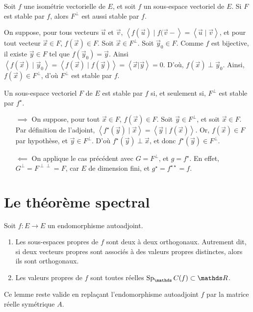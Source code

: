 \begin{prop}
	Soit $f$\/ une isométrie vectorielle de $E$, et soit $f$\/ un sous-espace vectoriel de $E$. Si $F$\/ est stable par $f$, alors $F^\perp$\/ est aussi stable par $f$.
\end{prop}

\begin{prv}
	On suppose, pour tous vecteurs $\vec{u}$\/ et $\vec{v}$, $\left<f(\vec{u}) \mid f(\vec{v}- \right> = \left<\vec{u}  \mid \vec{v} \right>$, et pour tout vecteur $\vec{x} \in F$, $f(\vec{x}) \in F$.
	Soit $\vec{x} \in F^\perp$.
	Soit $\vec{y}_0 \in F$.
	Comme $f$\/ est bijective, il existe $\vec{y} \in F$\/ tel que $f(\vec{y}_0) = \vec{y}$.
	Ainsi $\left<f(\vec{x})  \mid \vec{y}_0 \right> = \left<f(\vec{x})  \mid f(\vec{y}) \right> = \left<\vec{x} | \vec{y}\right> = 0$.
	D'où, $f(\vec{x}) \perp \vec{y}_0$.
	Ainsi, $f(\vec{x}) \in F^\perp$, d'où $F^\perp$\/ est stable par $f$.
\end{prv}

\begin{prop}
	 Un sous-espace vectoriel $F$\/ de $E$\/ est stable par $f$\/ si, et seulement si, $F^\perp$\/ est stable par $f^\star$.
\end{prop}

\begin{prv}
	\begin{itemize}
		\item[$\implies$] On suppose, pour tout $\vec{x} \in F$, $f(\vec{x}) \in F$. Soit $\vec{y} \in F^\perp$, et soit $\vec{x} \in F$.
			Par définition de l'adjoint, $\left<f^\star (\vec{y})  \mid \vec{x} \right> = \left<\vec{y}  \mid f(\vec{x}) \right>$.
			Or, $f(\vec{x}) \in F$\/ par hypothèse, et $\vec{y} \in F^\perp$.
			D'où $f^\star (\vec{y}) \perp \vec{x}$, et donc $f^\star (\vec{y}) \in F^\perp$.
		\item[$\impliedby$] On applique le cas précédent avec $G = F^\perp$, et $g = f^\star$. En effet, $G^\perp = F^{\perp\perp} = F$, car $E$\/ de dimension fini, et $g^\star = f^{\star\star} = f$.
	\end{itemize}
\end{prv}

\section{Le théorème spectral}

\begin{lem}
	Soit $f : E \to E$\/ un endomorphisme autoadjoint.
	\begin{enumerate}
		\item Les sous-espaces propres de $f$\/ sont deux à deux orthogonaux. Autrement dit, si deux vecteurs propres sont associés à des valeurs propres distinctes, alors ils sont orthogonaux.
		\item Les valeurs propres de $f$\/ sont toutes réelles $\Sp_\C(f) \subset \R$.
	\end{enumerate}
	Ce lemme reste valide en replaçant l'endomorphisme autoadjoint $f$\/ par la matrice réelle symétrique $A$.
\end{lem}

